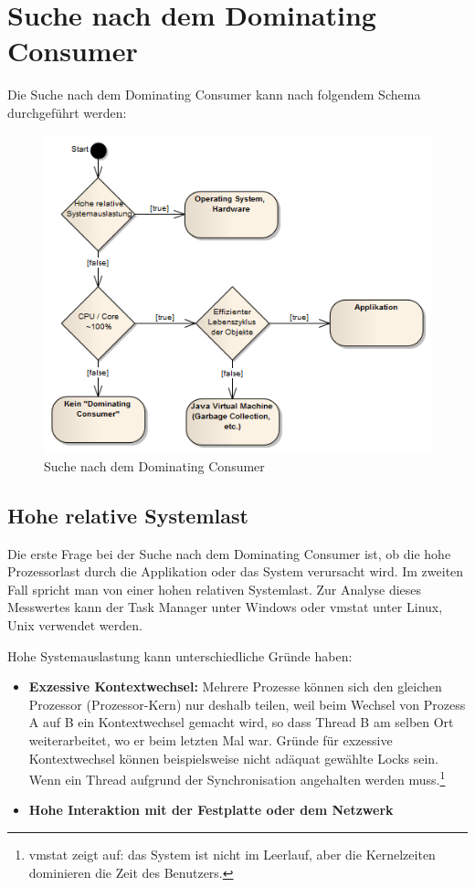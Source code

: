 \section{Suche nach dem Dominating Consumer}\label{dominating_consumer}
Die Suche nach dem Dominating Consumer kann nach folgendem Schema durchgeführt werden:
\begin{figure}[H]
  	\centering
    	\includegraphics[width=13.1cm]{images/dominating_consumer}
        	\caption{Suche nach dem Dominating Consumer}
\end{figure}

\subsection{Hohe relative Systemlast}\label{hohe_systemauslastung}
Die erste Frage bei der Suche nach dem Dominating Consumer  ist, ob die hohe Prozessorlast durch die Applikation oder das System verursacht wird. Im zweiten Fall spricht man von einer hohen relativen Systemlast. Zur Analyse dieses Messwertes kann der Task Manager unter Windows oder vmstat unter Linux, Unix verwendet werden.\newline 

Hohe Systemauslastung kann unterschiedliche Gründe haben: 
\begin{itemize}
\item \textbf{Exzessive Kontextwechsel:} Mehrere Prozesse können sich den gleichen Prozessor (Prozessor-Kern) nur deshalb teilen, weil beim Wechsel von Prozess A auf B ein Kontextwechsel gemacht wird, so dass Thread B am selben Ort weiterarbeitet, wo er beim letzten Mal war. Gründe für exzessive Kontextwechsel können beispielsweise nicht adäquat gewählte Locks sein. Wenn ein Thread aufgrund der Synchronisation angehalten werden muss.\footnote{vmstat zeigt auf: das System ist nicht im Leerlauf, aber die Kernelzeiten dominieren die Zeit des Benutzers.}
\item \textbf{Hohe Interaktion mit der Festplatte oder dem Netzwerk} 
\end{itemize}


